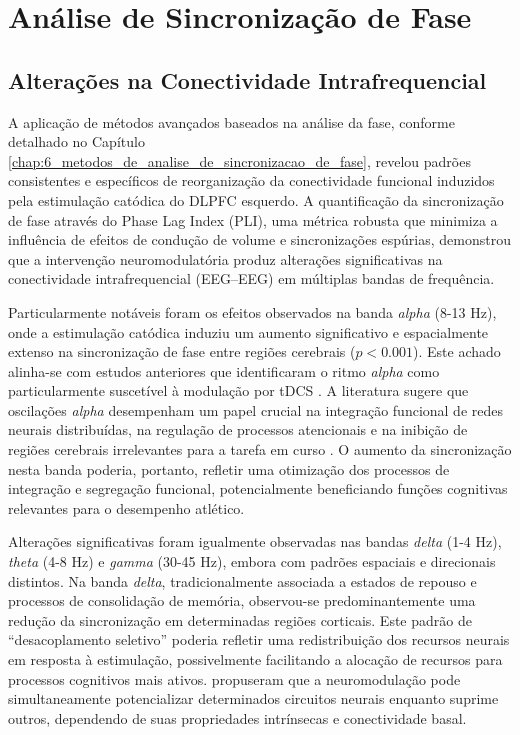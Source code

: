 \section{Análise de Sincronização de Fase}

\subsection{Alterações na Conectividade Intrafrequencial}
A aplicação de métodos avançados baseados na análise da fase, conforme detalhado no Capítulo \ref{chap:6_metodos_de_analise_de_sincronizacao_de_fase}, revelou padrões consistentes e específicos de reorganização da conectividade funcional induzidos pela estimulação catódica do DLPFC esquerdo. A quantificação da sincronização de fase através do Phase Lag Index (PLI), uma métrica robusta que minimiza a influência de efeitos de condução de volume e sincronizações espúrias, demonstrou que a intervenção neuromodulatória produz alterações significativas na conectividade intrafrequencial (EEG--EEG) em múltiplas bandas de frequência.

Particularmente notáveis foram os efeitos observados na banda \emph{alpha} (8-13 Hz), onde a estimulação catódica induziu um aumento significativo e espacialmente extenso na sincronização de fase entre regiões cerebrais ($p < 0.001$). Este achado alinha-se com estudos anteriores que identificaram o ritmo \emph{alpha} como particularmente suscetível à modulação por tDCS \cite{kunze2014high}. A literatura sugere que oscilações \emph{alpha} desempenham um papel crucial na integração funcional de redes neurais distribuídas, na regulação de processos atencionais e na inibição de regiões cerebrais irrelevantes para a tarefa em curso \cite{fries2015rhythms}. O aumento da sincronização nesta banda poderia, portanto, refletir uma otimização dos processos de integração e segregação funcional, potencialmente beneficiando funções cognitivas relevantes para o desempenho atlético.

Alterações significativas foram igualmente observadas nas bandas \emph{delta} (1-4 Hz), \emph{theta} (4-8 Hz) e \emph{gamma} (30-45 Hz), embora com padrões espaciais e direcionais distintos. Na banda \emph{delta}, tradicionalmente associada a estados de repouso e processos de consolidação de memória, observou-se predominantemente uma redução da sincronização em determinadas regiões corticais. Este padrão de ``desacoplamento seletivo'' poderia refletir uma redistribuição dos recursos neurais em resposta à estimulação, possivelmente facilitando a alocação de recursos para processos cognitivos mais ativos. \cite{scheler2019neuromodulation} propuseram que a neuromodulação pode simultaneamente potencializar determinados circuitos neurais enquanto suprime outros, dependendo de suas propriedades intrínsecas e conectividade basal.

